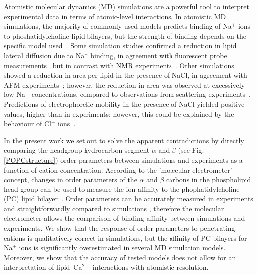 \documentclass[pre,aps,floatfix,authordate1-4,twocolumn]{revtex4-1}
\begin{document}
Atomistic molecular dynamics (MD) simulations are a powerful tool to interpret experimental data in terms of atomic-level interactions.
In atomistic MD simulations, the majority of commonly used models predicts binding of Na${^+}$ ions 
to phoshatidylcholine lipid bilayers, 
but the strength of binding depends on the specific model used~\cite{bockmann03,bockmann04,sachs04,berkowitz06,cordomi09,valley11,berkowitz12}. 
Some simulation studies confirmed a reduction in lipid lateral diffusion due to Na$^+$ binding, 
in agreement with fluorescent probe measurements~\cite{bockmann03,vacha09a,harb13} 
but in contrast with NMR experiments~\cite{filippov09}. 
Other simulations showed a reduction in area per lipid in the presence of NaCl, 
in agreement with AFM experiments~\cite{manyes05,manyes06,fukuma07,ferber11,morata12};
however, the reduction in area was observed at excessively low Na$^+$ concentrations, 
compared to observations from scattering experiments~\cite{pabst07}.
Predictions of electrophoretic mobility in the presence of NaCl yielded positive values, higher than in experiments; 
however, this could be explained by the behaviour of Cl$^-$ ions~\cite{berkowitz06,knecht13}.

In the present work we set out to solve the apparent contradictions 
by directly comparing the headgroup hydrocarbon segment
$\alpha$ and $\beta$ (see Fig. \ref{POPCstructure}) order parameters between simulations
and experiments as a function of cation concentration. 
According to the 'molecular electrometer' concept, changes in order parameters of the $\alpha$ and $\beta$ carbons 
in the phospholipid head group can be used to measure the ion affinity to the 
phophatidylcholine (PC) lipid bilayer~\cite{akutsu81,altenbach84,seelig87,scherer89}.
Order parameters can be accurately measured in experiments and straightforwardly compared to 
simulations \cite{ollila15}, therefore the molecular electrometer allows the 
comparison of binding affinity between simulations and experiments. 
We show that the response of order parameters to penetrating cations 
is qualitatively correct in simulations, but the affinity of PC bilayers for Na$^{+}$ ions 
is significantly overestimated in several MD simulation models. 
Moreover, we show that the accuracy of tested models does not allow for
an interpretation of lipid--Ca$^{2+}$ interactions with atomistic resolution.
\end{document}

